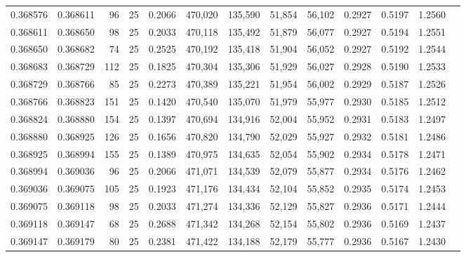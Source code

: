 \begin{tabular}{rrrrrrrrrrrrr}
0.368576 & 0.368611 &    96 &  25 &                                     0.2066 & 470,020 & 135,590 &  51,854 &  56,102 & 0.2927 & 0.5197 & 1.2560 \\
0.368611 & 0.368650 &    98 &  25 &                                     0.2033 & 470,118 & 135,492 &  51,879 &  56,077 & 0.2927 & 0.5194 & 1.2551 \\
0.368650 & 0.368682 &    74 &  25 &                                     0.2525 & 470,192 & 135,418 &  51,904 &  56,052 & 0.2927 & 0.5192 & 1.2544 \\
0.368683 & 0.368729 &   112 &  25 &                                     0.1825 & 470,304 & 135,306 &  51,929 &  56,027 & 0.2928 & 0.5190 & 1.2533 \\
0.368729 & 0.368766 &    85 &  25 &                                     0.2273 & 470,389 & 135,221 &  51,954 &  56,002 & 0.2929 & 0.5187 & 1.2526 \\
0.368766 & 0.368823 &   151 &  25 &                                     0.1420 & 470,540 & 135,070 &  51,979 &  55,977 & 0.2930 & 0.5185 & 1.2512 \\
0.368824 & 0.368880 &   154 &  25 &                                     0.1397 & 470,694 & 134,916 &  52,004 &  55,952 & 0.2931 & 0.5183 & 1.2497 \\
0.368880 & 0.368925 &   126 &  25 &                                     0.1656 & 470,820 & 134,790 &  52,029 &  55,927 & 0.2932 & 0.5181 & 1.2486 \\
0.368925 & 0.368994 &   155 &  25 &                                     0.1389 & 470,975 & 134,635 &  52,054 &  55,902 & 0.2934 & 0.5178 & 1.2471 \\
0.368994 & 0.369036 &    96 &  25 &                                     0.2066 & 471,071 & 134,539 &  52,079 &  55,877 & 0.2934 & 0.5176 & 1.2462 \\
0.369036 & 0.369075 &   105 &  25 &                                     0.1923 & 471,176 & 134,434 &  52,104 &  55,852 & 0.2935 & 0.5174 & 1.2453 \\
0.369075 & 0.369118 &    98 &  25 &                                     0.2033 & 471,274 & 134,336 &  52,129 &  55,827 & 0.2936 & 0.5171 & 1.2444 \\
0.369118 & 0.369147 &    68 &  25 &                                     0.2688 & 471,342 & 134,268 &  52,154 &  55,802 & 0.2936 & 0.5169 & 1.2437 \\
0.369147 & 0.369179 &    80 &  25 &                                     0.2381 & 471,422 & 134,188 &  52,179 &  55,777 & 0.2936 & 0.5167 & 1.2430 \\

\end{tabular}
